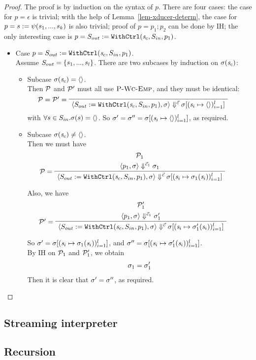 \begin{proof}
	The proof is by induction on the syntax of $p$. There are four cases: the case for $p = \epsilon$ is trivial; with the help of Lemma~\ref{lem-xducer-determ}, the case for $p = s := \psi(s_1,...,s_k)$ is also trivial; proof of $p = p_1; p_2$ can be done by IH; the only interesting case is $p = S_{out} := \mathtt{WithCtrl}(\mathit{s}_c,S_{in},p_1)$.
	\begin{itemize}
		\item Case $p = S_{out} := \mathtt{WithCtrl}(\mathit{s}_c,S_{in},p_1)$. \\
		Assume $S_{out} = \{s_1,...,s_l\}$. There are two subcases by induction on $\sigma(\mathit{s}_c)$: 
		\begin{itemize}
			\item Subcase $\sigma(\mathit{s}_c) = \langle \rangle$. \\
			Then $\mathcal{P}$ and $\mathcal{P}'$ must all use $\textsc{P-Wc-Emp}$, and they must be identical:		
			$$\PT{ 
				\LeLa{\MP= \MP' =}
				\Axiom{\seval{\withctrl{\s_c}{p_1}{\Sin}{\Sout}}{\sgm}{\c}{\sgm[\l{\s_i \|-> \emptyv}]}}
			}$$
		    with $ \forall s \in S_{in}. \sigma(s) = \langle \rangle$.
		    So $\sgm' = \sgm'' = \sgm[\l{\s_i \|-> \emptyv}]$, as required. 
		    
		    \item Subcase $\sigma(\mathit{s}_c) \neq \langle \rangle$. \\
		    Then we must have
			$$\PT{
				\UCN{\MP_1}{\seval{p_1}{\sgm}{\c_1}{\sgm_1}}
				\LeLa{\MP = }
				\UC{\seval{\withctrl{\s_c}{p_1}{\Sin}{\Sout}}{\sgm}{\c}{\sgm[\l{\s_i \|-> \sgm_1(\s_i)}]}}
			}$$
		
			Also, we have
			$$\PT{
				\UCN{\MP'_1}{\seval{p_1}{\sgm}{\c_1}{\sgm'_1}}
				\LeLa{\MP' = }
				\UC{\seval{\withctrl{\s_c}{p_1}{\Sin}{\Sout}}{\sgm}{\c}{\sgm[\l{\s_i \|-> \sgm'_1(\s_i)}]}}
			}$$
		
			So $\sgm' = \sgm[\l{\s_i \|-> \sgm_1(\s_i)}]$, 
			and $\sgm'' = \sgm[\l{\s_i \|-> \sgm'_1(\s_i)}]$. \\
			By IH on $\mathcal{P}_1$ and $\mathcal{P}'_1$, we obtain
			$$\sigma_1 = \sigma_1'$$
			Then it is clear that $\sigma' = \sigma''$, as required.
			
		\end{itemize} 
		
	\end{itemize}

\end{proof}


\subsection{Streaming interpreter}

\subsection{Recursion}



